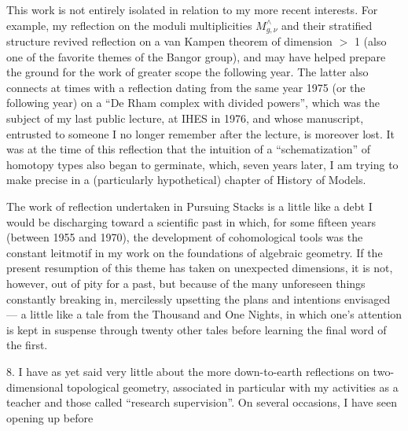 
This work is not entirely isolated in relation to
my more recent interests. For example, my reflection on the
moduli multiplicities $M^{\wedge}_{g,\nu}$ and their stratified structure
revived reflection on a van Kampen theorem of dimension
$>$ 1 (also one of the favorite themes of the Bangor
group), and may have helped prepare the ground for
the work of greater scope the following year. The latter
also connects at times with a reflection dating from the same
year 1975 (or the following year) on a ``De Rham complex with
divided powers'', which was the subject of my last public
lecture, at IHES in 1976, and whose manuscript, entrusted
to someone I no longer remember after the lecture, is moreover lost.
It was at the time of this reflection that the intuition
of a ``schematization'' of homotopy types also began to germinate, which,
seven years later, I am trying to make precise in a (particularly
hypothetical) chapter of History of Models.

The work of reflection undertaken in Pursuing
Stacks is a little like a debt I would be discharging
toward a scientific past in which, for some fifteen
years (between 1955 and 1970), the development of cohomological
tools was the constant leitmotif in my work on the
foundations of algebraic geometry. If the present resumption of this
theme has taken on unexpected dimensions, it is not,
however, out of pity for a past, but because of the many unforeseen
things constantly breaking in, mercilessly upsetting the
plans and intentions envisaged --- a little like a tale from the Thousand and
One Nights, in which one's attention is kept in suspense through
twenty other tales before learning the final word of the first.


8. I have as yet said very little about the more down-to-earth
reflections on two-dimensional topological geometry, associated
in particular with my activities as a teacher and those called ``research
supervision''. On several occasions, I have seen opening up before

